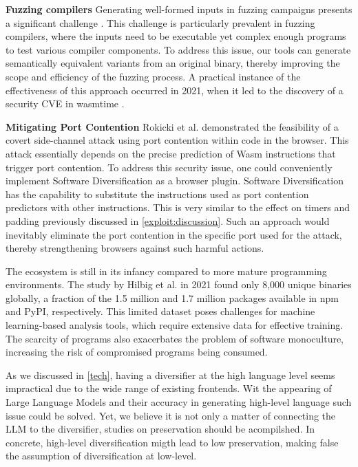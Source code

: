 \textbf{Fuzzing \Wasm compilers}
Generating well-formed inputs in fuzzing campaigns presents a significant challenge \cite{7958599}. 
This challenge is particularly prevalent in fuzzing compilers, where the inputs need to be executable yet complex enough programs to test various compiler components. 
To address this issue, our tools can generate semantically equivalent variants from an original \wasm binary, thereby improving the scope and efficiency of the fuzzing process. 
A practical instance of the effectiveness of this approach occurred in 2021, when it led to the discovery of a security CVE in wasmtime \cite{CVE}.



\textbf{Mitigating Port Contention}
Rokicki et al. \cite{10.1145/3488932.3517411} demonstrated the feasibility of a covert side-channel attack using port contention within \Wasm code in the browser. 
This attack essentially depends on the precise prediction of Wasm instructions that trigger port contention.
To address this security issue, one could conveniently implement Software Diversification as a browser plugin. 
Software Diversification has the capability to substitute the \wasm instructions used as port contention predictors with other instructions. 
This is very similar to the effect on timers and padding previously discussed in \autoref{exploit:discussion}.
Such an approach would inevitably eliminate the port contention in the specific port used for the attack, thereby strengthening browsers against such harmful actions.



 The \Wasm ecosystem is still in its infancy compared to more mature programming environments. 
The study by Hilbig et al. in 2021 found only 8,000 unique \Wasm binaries globally\cite{Hilbig2021AnES}, a fraction of the 1.5 million and 1.7 million packages available in npm and PyPI, respectively. 
This limited dataset poses challenges for machine learning-based analysis tools, which require extensive data for effective training. 
The scarcity of \Wasm programs also exacerbates the problem of software monoculture, increasing the risk of compromised \Wasm programs being consumed\cite{usenixWasm2020}. 

As we discussed in \autoref{tech}, having a diversifier at the high language level seems impractical due to the wide range of existing frontends.
Wit the appearing of Large Language Models and their accuracy in generating high-level language such issue could be solved.
Yet, we believe it is not only a matter of connecting the LLM to the diversifier, studies on preservation should be acompilshed.
In concrete, high-level diversification migth lead to low preservation, making false the assumption of diversification at low-level.
